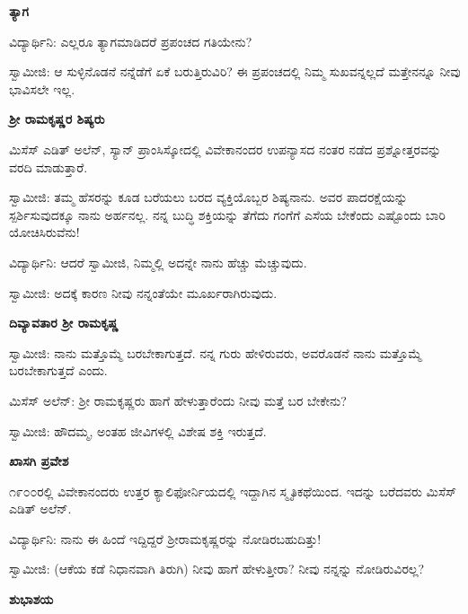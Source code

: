 \begin{center}
\textbf{ತ್ಯಾಗ}
\end{center}

ವಿದ್ಯಾರ್ಥಿನಿ: ಎಲ್ಲರೂ ತ್ಯಾಗಮಾಡಿದರೆ ಪ್ರಪಂಚದ ಗತಿಯೇನು?

ಸ್ವಾಮೀಜಿ: ಆ ಸುಳ್ಳಿನೊಡನೆ ನನ್ನೆಡೆಗೆ ಏಕೆ ಬರುತ್ತಿರುವಿರಿ? ಈ ಪ್ರಪಂಚದಲ್ಲಿ ನಿಮ್ಮ ಸುಖವನ್ನಲ್ಲದೆ ಮತ್ತೇನನ್ನೂ ನೀವು ಭಾವಿಸಲೇ ಇಲ್ಲ.

\begin{center}
\textbf{ಶ‍್ರೀ ರಾಮಕೃಷ್ಣರ ಶಿಷ್ಯರು}
\end{center}

ಮಿಸೆಸ್ ಎಡಿತ್ ಅಲೆನ್, ಸ್ಯಾನ್ ಪ್ರಾಂಸಿಸ್ಕೋದಲ್ಲಿ ವಿವೇಕಾನಂದರ ಉಪನ್ಯಾಸದ ನಂತರ ನಡೆದ ಪ್ರಶ್ನೋತ್ತರವನ್ನು ವರದಿ ಮಾಡುತ್ತಾರೆ.

ಸ್ವಾಮೀಜಿ: ತಮ್ಮ ಹೆಸರನ್ನು ಕೂಡ ಬರೆಯಲು ಬರದ ವ್ಯಕ್ತಿಯೊಬ್ಬರ ಶಿಷ್ಯನಾನು. ಅವರ ಪಾದರಕ್ಷೆಯನ್ನು ಸ್ಪರ್ಶಿಸುವುದಕ್ಕೂ ನಾನು ಅರ್ಹನಲ್ಲ. ನನ್ನ ಬುದ್ಧಿ ಶಕ್ತಿಯನ್ನು ತೆಗೆದು ಗಂಗೆಗೆ ಎಸೆಯ ಬೇಕೆಂದು ಎಷ್ಟೊಂದು ಬಾರಿ ಯೋಚಿಸಿರುವೆನು!

ವಿದ್ಯಾರ್ಥಿನಿ: ಆದರೆ ಸ್ವಾಮೀಜಿ, ನಿಮ್ಮಲ್ಲಿ ಅದನ್ನೇ ನಾನು ಹೆಚ್ಚು ಮೆಚ್ಚುವುದು.

ಸ್ವಾಮೀಜಿ: ಅದಕ್ಕೆ ಕಾರಣ ನೀವು ನನ್ನಂತೆಯೇ ಮೂರ್ಖರಾಗಿರುವುದು.

\begin{center}
\textbf{ದಿವ್ಯಾವತಾರ ಶ‍್ರೀ ರಾಮಕೃಷ್ಣ}
\end{center}

ಸ್ವಾಮೀಜಿ: ನಾನು ಮತ್ತೊಮ್ಮೆ ಬರಬೇಕಾಗುತ್ತದೆ. ನನ್ನ ಗುರು ಹೇಳಿರುವರು, ಅವರೊಡನೆ ನಾನು ಮತ್ತೊಮ್ಮೆ ಬರಬೇಕಾಗುತ್ತದೆ ಎಂದು.

ಮಿಸೆಸ್ ಅಲೆನ್: ಶ‍್ರೀ ರಾಮಕೃಷ್ಣರು ಹಾಗೆ ಹೇಳುತ್ತಾರೆಂದು ನೀವು ಮತ್ತೆ ಬರ ಬೇಕೇನು?

ಸ್ವಾಮೀಜಿ: ಹೌದಮ್ಮ, ಅಂತಹ ಜೀವಿಗಳಲ್ಲಿ ವಿಶೇಷ ಶಕ್ತಿ ಇರುತ್ತದೆ.

\begin{center}
\textbf{ಖಾಸಗಿ ಪ್ರವೇಶ}
\end{center}

೧೯೦೦ರಲ್ಲಿ ವಿವೇಕಾನಂದರು ಉತ್ತರ ಕ್ಯಾಲಿಫೋರ್ನಿಯದಲ್ಲಿ ಇದ್ದಾಗಿನ ಸ್ಮೃತಿಕಥೆಯಿಂದ. ಇದನ್ನು ಬರೆದವರು ಮಿಸೆಸ್ ಎಡಿತ್ ಅಲೆನ್.

ವಿದ್ಯಾರ್ಥಿನಿ: ನಾನು ಈ ಹಿಂದೆ ಇದ್ದಿದ್ದರೆ ಶ‍್ರೀರಾಮಕೃಷ್ಣರನ್ನು ನೋಡಿರಬಹುದಿತ್ತು!

ಸ್ವಾಮೀಜಿ: (ಆಕೆಯ ಕಡೆ ನಿಧಾನವಾಗಿ ತಿರುಗಿ) ನೀವು ಹಾಗೆ ಹೇಳುತ್ತೀರಾ? ನೀವು ನನ್ನನ್ನು ನೋಡಿರುವಿರಲ್ಲ?

\begin{center}
\textbf{ಶುಭಾಶಯ}
\end{center}


